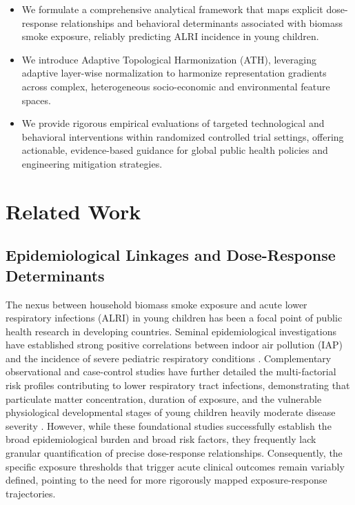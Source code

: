 \documentclass[10pt,twocolumn]{article}
\begin{document}
\begin{itemize}
    \item We formulate a comprehensive analytical framework that maps explicit dose-response relationships and behavioral determinants associated with biomass smoke exposure, reliably predicting ALRI incidence in young children.
    \item We introduce Adaptive Topological Harmonization (ATH), leveraging adaptive layer-wise normalization to harmonize representation gradients across complex, heterogeneous socio-economic and environmental feature spaces.
    \item We provide rigorous empirical evaluations of targeted technological and behavioral interventions within randomized controlled trial settings, offering actionable, evidence-based guidance for global public health policies and engineering mitigation strategies.
\end{itemize}

\section{Related Work}
\subsection{Epidemiological Linkages and Dose-Response Determinants}
The nexus between household biomass smoke exposure and acute lower respiratory infections (ALRI) in young children has been a focal point of public health research in developing countries. Seminal epidemiological investigations have established strong positive correlations between indoor air pollution (IAP) and the incidence of severe pediatric respiratory conditions \cite{target_ref}. Complementary observational and case-control studies have further detailed the multi-factorial risk profiles contributing to lower respiratory tract infections, demonstrating that particulate matter concentration, duration of exposure, and the vulnerable physiological developmental stages of young children heavily moderate disease severity \cite{ref_4}. However, while these foundational studies successfully establish the broad epidemiological burden and broad risk factors, they frequently lack granular quantification of precise dose-response relationships. Consequently, the specific exposure thresholds that trigger acute clinical outcomes remain variably defined, pointing to the need for more rigorously mapped exposure-response trajectories.
\end{document}
